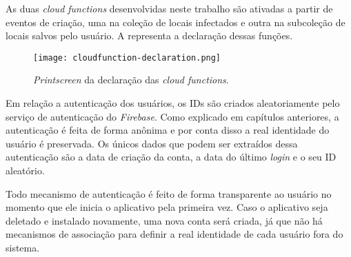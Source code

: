 As duas \textit{cloud functions} desenvolvidas neste trabalho são ativadas a partir de eventos de criação, uma na coleção de locais infectados e outra na subcoleção de locais salvos pelo usuário. A  representa a declaração dessas funções.

\begin{figure}[!htb]
  \centering
  \texttt{[image: cloudfunction-declaration.png]}
  \caption{\textit{Printscreen} da declaração das \textit{cloud functions}.}
  \label{fig:cfdeclaration}
\end{figure}

Em relação a autenticação dos usuários, os IDs são criados aleatoriamente pelo serviço de autenticação do \textit{Firebase}. Como explicado em capítulos anteriores, a autenticação é feita de forma anônima e por conta disso a real identidade do usuário é preservada. Os únicos dados que podem ser extraídos dessa autenticação são a data de criação da conta, a data do último \textit{login} e o seu ID aleatório.

Todo mecanismo de autenticação é feito de forma transparente ao usuário no momento que ele inicia o aplicativo pela primeira vez. Caso o aplicativo seja deletado e instalado novamente, uma nova conta será criada, já que não há mecanismos de associação para definir a real identidade de cada usuário fora do sistema.
